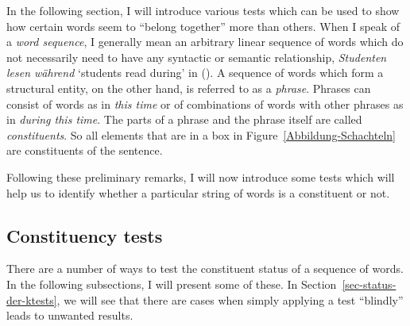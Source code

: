 {\noindent
In the following section, I will introduce various tests which can be used to show how certain
words seem to ``belong together'' more than others. When I speak of a \emph{word sequence}, I generally mean
an arbitrary linear sequence of words which do not necessarily need to have any syntactic or semantic relationship, \eg
\emph{Studenten lesen während} `students read during' in (). A sequence of words which form a
structural entity, on the other hand,  is referred to as a \emph{phrase}. Phrases can
consist of words as in \emph{this time} or of combinations of words with other phrases as in
\emph{during this time}. The parts of a phrase and the phrase itself are called
\emph{constituents}. So all elements that are in a box in
Figure~\ref{Abbildung-Schachteln} are constituents of the sentence. 


Following these preliminary remarks, I will now introduce some tests which will help us to identify whether a particular
string of words is a constituent or not.


\subsection{Constituency tests}

There are a number of ways to test the constituent status of a sequence of words. In the following subsections, I will present some of these. In 
Section~\ref{sec-status-der-ktests}, we will see that there are cases when simply applying a test ``blindly'' leads to unwanted results.

}
